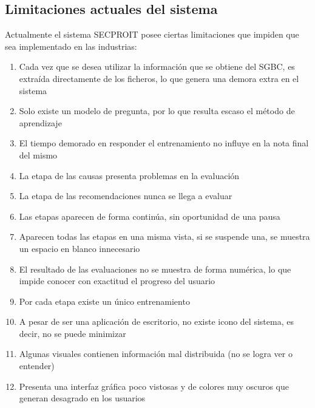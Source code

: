 \subsection{Limitaciones actuales del sistema}
Actualmente el sistema SECPROIT posee ciertas limitaciones que impiden que sea implementado en las industrias:
\begin{enumerate}
\item Cada vez que se desea utilizar la información que se obtiene del SGBC, es extraída directamente de los ficheros, lo que genera una demora extra en el sistema
\item Solo existe un modelo de pregunta, por lo que resulta escaso el método de aprendizaje
\item El tiempo demorado en responder el entrenamiento no influye en la nota final del mismo
\item La etapa de las causas presenta problemas en la evaluación
\item La etapa de las recomendaciones nunca se llega a evaluar
\item Las etapas aparecen de forma continúa, sin oportunidad de una pausa
\item Aparecen todas las etapas en una misma vista, si se suspende una, se muestra un espacio en blanco innecesario
\item El resultado de las evaluaciones no se muestra de forma numérica, lo que impide conocer con exactitud el progreso del usuario
\item Por cada etapa existe un único entrenamiento
\item A pesar de ser una aplicación de escritorio, no existe icono del sistema, es decir, no se puede minimizar
\item Algunas visuales contienen información mal distribuida (no se logra ver o entender)
\item Presenta una interfaz gráfica poco vistosas y de colores muy oscuros que generan desagrado en los usuarios
\end{enumerate}

